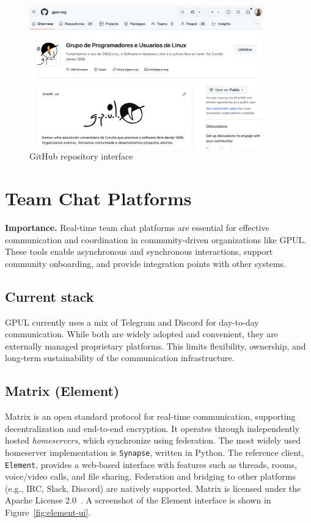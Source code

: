 \begin{figure}[H]
  \centering
  \includegraphics[width=0.9\textwidth]{imaxes/github-ui.png}
  \caption{GitHub repository interface}
  \label{fig:github-ui}
\end{figure}

\section{Team Chat Platforms}

\textbf{Importance.} Real-time team chat platforms are essential for effective communication and coordination in community-driven organizations like GPUL. These tools enable asynchronous and synchronous interactions, support community onboarding, and provide integration points with other systems.

\subsection{Current stack}

GPUL currently uses a mix of Telegram and Discord for day-to-day communication. While both are widely adopted and convenient, they are externally managed proprietary platforms. This limits flexibility, ownership, and long-term sustainability of the communication infrastructure.

\subsection{Matrix (Element)}

Matrix is an open standard protocol for real-time communication, supporting decentralization and end-to-end encryption. It operates through independently hosted \emph{homeservers}, which synchronize using federation. The most widely used homeserver implementation is \texttt{Synapse}, written in Python. The reference client, \texttt{Element}, provides a web-based interface with features such as threads, rooms, voice/video calls, and file sharing. Federation and bridging to other platforms (e.g., IRC, Slack, Discord) are natively supported. Matrix is licensed under the Apache License 2.0~\cite{matrix-docs}. A screenshot of the Element interface is shown in Figure~\ref{fig:element-ui}.

